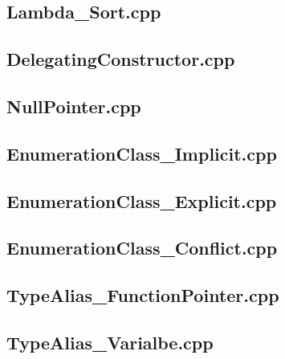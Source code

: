 \documentclass[11pt]{report}
\begin{document}
\begin{appendix}
\subsection{Lambda\_Sort.cpp}
\label{Lambda_Sort}


\subsection{DelegatingConstructor.cpp}
\label{DelegatingConstructor}


\subsection{NullPointer.cpp}
\label{NullPointer}


\subsection{EnumerationClass\_Implicit.cpp}
\label{EnumerationClass_Implicit}


\subsection{EnumerationClass\_Explicit.cpp}
\label{EnumerationClass_Explicit}


\subsection{EnumerationClass\_Conflict.cpp}
\label{EnumerationClass_Conflict}


\subsection{TypeAlias\_FunctionPointer.cpp}
\label{TypeAlias_FunctionPointer}


\subsection{TypeAlias\_Varialbe.cpp}
\label{TypeAlias_Varialbe}



\end{appendix}
\end{document}
